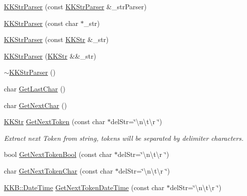 \begin{DoxyCompactItemize}
\item 
\hyperlink{class_k_k_b_1_1_k_k_str_parser_a0d50d5eeb72265e1eef03996ab5304ac}{K\+K\+Str\+Parser} (const \hyperlink{class_k_k_b_1_1_k_k_str_parser}{K\+K\+Str\+Parser} \&\+\_\+str\+Parser)
\item 
\hyperlink{class_k_k_b_1_1_k_k_str_parser_a1476b2b9482a12e9ba4fe59beb82ce82}{K\+K\+Str\+Parser} (const char $\ast$\+\_\+str)
\item 
\hyperlink{class_k_k_b_1_1_k_k_str_parser_a1f1d717a1128f49bac053ab895ee76c3}{K\+K\+Str\+Parser} (const \hyperlink{class_k_k_b_1_1_k_k_str}{K\+K\+Str} \&\+\_\+str)
\item 
\hyperlink{class_k_k_b_1_1_k_k_str_parser_a92dddf25fcaa5d355fd5de436bb8bf54}{K\+K\+Str\+Parser} (\hyperlink{class_k_k_b_1_1_k_k_str}{K\+K\+Str} \&\&\+\_\+str)
\item 
\hyperlink{class_k_k_b_1_1_k_k_str_parser_a3aeca12630e7072456b7ee56c2bd2e79}{$\sim$\+K\+K\+Str\+Parser} ()
\item 
char \hyperlink{class_k_k_b_1_1_k_k_str_parser_a49b50fe61e4715f842ccaa2cefb448d3}{Get\+Last\+Char} ()
\item 
char \hyperlink{class_k_k_b_1_1_k_k_str_parser_aa304a5187725efee272ad9b9e548a54a}{Get\+Next\+Char} ()
\item 
\hyperlink{class_k_k_b_1_1_k_k_str}{K\+K\+Str} \hyperlink{class_k_k_b_1_1_k_k_str_parser_a8be34e183eb27872a3813fdd118fc90c}{Get\+Next\+Token} (const char $\ast$del\+Str=\char`\"{}\textbackslash{}n\textbackslash{}t\textbackslash{}r \char`\"{})
\begin{DoxyCompactList}\small\item\em Extract next Token from string, tokens will be separated by delimiter characters. \end{DoxyCompactList}\item 
bool \hyperlink{class_k_k_b_1_1_k_k_str_parser_a762331bbeff40f11637b3f5fa79afed0}{Get\+Next\+Token\+Bool} (const char $\ast$del\+Str=\char`\"{}\textbackslash{}n\textbackslash{}t\textbackslash{}r \char`\"{})
\item 
char \hyperlink{class_k_k_b_1_1_k_k_str_parser_ab9be1a13e5b51467aa0bfe52b6472e01}{Get\+Next\+Token\+Char} (const char $\ast$del\+Str=\char`\"{}\textbackslash{}n\textbackslash{}t\textbackslash{}r \char`\"{})
\item 
\hyperlink{class_k_k_b_1_1_date_time}{K\+K\+B\+::\+Date\+Time} \hyperlink{class_k_k_b_1_1_k_k_str_parser_a01ca60284bd2d1e791e1a5f101eab930}{Get\+Next\+Token\+Date\+Time} (const char $\ast$del\+Str=\char`\"{}\textbackslash{}n\textbackslash{}t\textbackslash{}r \char`\"{})

\end{DoxyCompactItemize}
